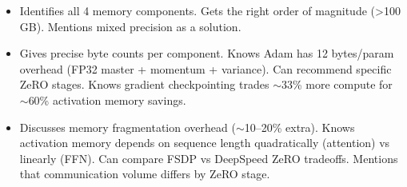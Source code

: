 \begin{interviewq}
\goodgreat
\begin{itemize}
    \item {} Identifies all 4 memory components. Gets the right order of magnitude (>100 GB). Mentions mixed precision as a solution.
    \item {} Gives precise byte counts per component. Knows Adam has 12 bytes/param overhead (FP32 master + momentum + variance). Can recommend specific ZeRO stages. Knows gradient checkpointing trades $\sim$33\% more compute for $\sim$60\% activation memory savings.
    \item {} Discusses memory fragmentation overhead ($\sim$10--20\% extra). Knows activation memory depends on sequence length quadratically (attention) vs linearly (FFN). Can compare FSDP vs DeepSpeed ZeRO tradeoffs. Mentions that communication volume differs by ZeRO stage.
\end{itemize}

\end{interviewq}

